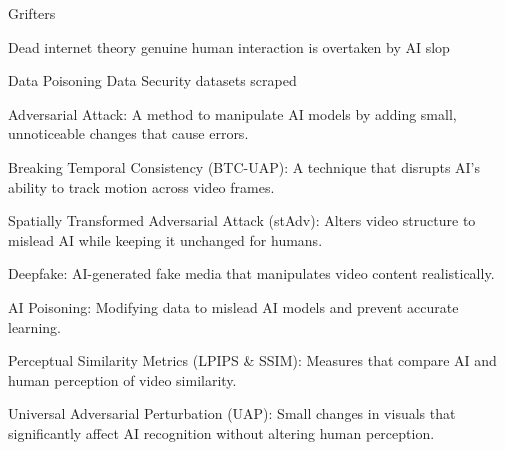 Grifters

Dead internet theory
    genuine human interaction is overtaken by AI slop

Data Poisoning
Data Security
datasets
scraped

Adversarial Attack: A method to manipulate AI models by adding small, unnoticeable changes that cause errors.

Breaking Temporal Consistency (BTC-UAP): A technique that disrupts AI’s ability to track motion across video frames.

Spatially Transformed Adversarial Attack (stAdv): Alters video structure to mislead AI while keeping it unchanged for humans.

Deepfake: AI-generated fake media that manipulates video content realistically.

AI Poisoning: Modifying data to mislead AI models and prevent accurate learning.

Perceptual Similarity Metrics (LPIPS \& SSIM): Measures that compare AI and human perception of video similarity.

Universal Adversarial Perturbation (UAP): Small changes in visuals that significantly affect AI recognition without altering human perception.
